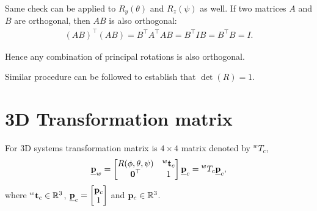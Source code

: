 \documentclass[twocolumn]{article}
\begin{document}
Same  check can be applied to $R_y(\theta)$ and  $R_z(\psi)$  as   well. If two
matrices  $A$ and  $B$ are orthogonal, then $AB$ is also orthogonal:
\begin{align}
  (AB)^\top(AB)  = B^\top A^\top A B =   B^\top I  B =  B^\top B = I.
\end{align}

Hence any combination of principal rotations is also orthogonal.

Similar procedure can  be followed to establish  that  $\det(R) = 1$.

\section{3D  Transformation matrix}
For  3D  systems transformation matrix is  $4 \times 4$ matrix denoted  by ${}^wT_c$,
% 
\begin{align}
  \underline{\mathbf{p}}_w = \begin{bmatrix}
    R(\phi, \theta, \psi) & {}^w\mathbf{t}_c  \\
    \boldsymbol{0}^\top &  1
  \end{bmatrix}  \underline{\mathbf{p}}_c  = {}^wT_c \underline{\mathbf{p}}_c,
\end{align}
% 
where  ${}^w\mathbf{t}_c   \in \mathbb{R}^3$, $\underline{\mathbf{p}}_c =  \begin{bmatrix} \mathbf{p}_c   \\
  1   \end{bmatrix}$ and $\mathbf{p}_c  \in \mathbb{R}^3$.
\end{document}

